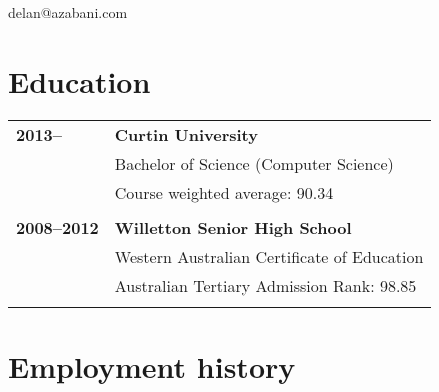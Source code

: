 \documentclass[a4paper,12pt]{article}
\begin{document}
\hrulefill

\hspace{1cm}\begin{minipage}{7cm}
	{\Huge delan\textcolor{lg}@azabani\textcolor{lg}{.com}}
\end{minipage}\hfill\begin{minipage}{4cm}
\end{minipage}\hspace{1cm}

\hrulefill

\section*{Education}

\begin{tabular}{p{3.5cm}p{12.5cm}}
	\textbf{2013--} &
		\textbf{Curtin University}\\
		& Bachelor of Science (Computer Science)\\
		& Course weighted average: 90.34\\\\
	\textbf{2008--2012} &
		\textbf{Willetton Senior High School}\\
		& Western Australian Certificate of Education\\
		& Australian Tertiary Admission Rank: 98.85\\\\
\end{tabular}

\section*{Employment history}
\end{document}
